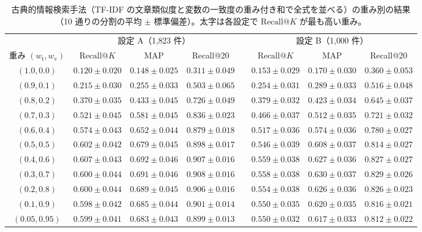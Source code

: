 \documentclass[a4j,dvipdfmx,11pt]{jresume}
\makeatletter
\newcommand{\rk}{\textrm{Recall@}K}
\makeatother
\begin{document}
\begin{table}[h]\centering
\small
\caption{古典的情報検索手法（TF-IDF の文章類似度と変数の一致度の重み付き和で全式を並べる）の重み別の結果（10 通りの分割の平均 $\pm$ 標準偏差）。太字は各設定で $\rk$ が最も高い重み。}
\label{tab:weights}
\footnotesize
\setlength{\tabcolsep}{2.5pt}
\begin{tabular}{@{}cccccccc@{}}
\toprule
 & \multicolumn{3}{c}{設定 A（1{,}823 件）} & & \multicolumn{3}{c}{設定 B（1{,}000 件）} \\
\cmidrule{2-4}\cmidrule{6-8}
重み $(w_{\mathrm{t}}, w_{\mathrm{v}})$ & $\rk$ & MAP & Recall@20 & & $\rk$ & MAP & Recall@20 \\
\midrule
$(1.0, 0.0)$ & $0.120 \pm 0.020$ & $0.148 \pm 0.025$ & $0.311 \pm 0.049$ & & $0.153 \pm 0.029$ & $0.170 \pm 0.030$ & $0.360 \pm 0.053$ \\
$(0.9, 0.1)$ & $0.215 \pm 0.030$ & $0.255 \pm 0.033$ & $0.503 \pm 0.065$ & & $0.254 \pm 0.031$ & $0.289 \pm 0.033$ & $0.516 \pm 0.048$ \\
$(0.8, 0.2)$ & $0.370 \pm 0.035$ & $0.433 \pm 0.045$ & $0.726 \pm 0.049$ & & $0.379 \pm 0.032$ & $0.423 \pm 0.034$ & $0.645 \pm 0.037$ \\
$(0.7, 0.3)$ & $0.521 \pm 0.045$ & $0.581 \pm 0.045$ & $0.836 \pm 0.023$ & & $0.466 \pm 0.037$ & $0.512 \pm 0.035$ & $0.721 \pm 0.032$ \\
$(0.6, 0.4)$ & $0.574 \pm 0.043$ & $0.652 \pm 0.044$ & $0.879 \pm 0.018$ & & $0.517 \pm 0.036$ & $0.574 \pm 0.036$ & $0.780 \pm 0.027$ \\
$(0.5, 0.5)$ & $0.602 \pm 0.042$ & $0.679 \pm 0.045$ & $0.898 \pm 0.017$ & & $0.546 \pm 0.039$ & $0.608 \pm 0.037$ & $0.814 \pm 0.027$ \\
$\mathbf{(0.4, 0.6)}$ & $\mathbf{0.607 \pm 0.043}$ & $0.692 \pm 0.046$ & $0.907 \pm 0.016$ & & $\mathbf{0.559 \pm 0.038}$ & $0.627 \pm 0.036$ & $0.827 \pm 0.027$ \\
$(0.3, 0.7)$ & $0.600 \pm 0.044$ & $0.691 \pm 0.046$ & $0.908 \pm 0.016$ & & $0.558 \pm 0.038$ & $0.630 \pm 0.037$ & $0.829 \pm 0.026$ \\
$(0.2, 0.8)$ & $0.600 \pm 0.044$ & $0.689 \pm 0.045$ & $0.906 \pm 0.016$ & & $0.554 \pm 0.038$ & $0.626 \pm 0.036$ & $0.826 \pm 0.023$ \\
$(0.1, 0.9)$ & $0.598 \pm 0.042$ & $0.685 \pm 0.044$ & $0.901 \pm 0.014$ & & $0.550 \pm 0.035$ & $0.620 \pm 0.035$ & $0.816 \pm 0.021$ \\
$(0.05, 0.95)$ & $0.599 \pm 0.041$ & $0.683 \pm 0.043$ & $0.899 \pm 0.013$ & & $0.550 \pm 0.032$ & $0.617 \pm 0.033$ & $0.812 \pm 0.022$ \\

\end{tabular}
\end{table}
\end{document}
